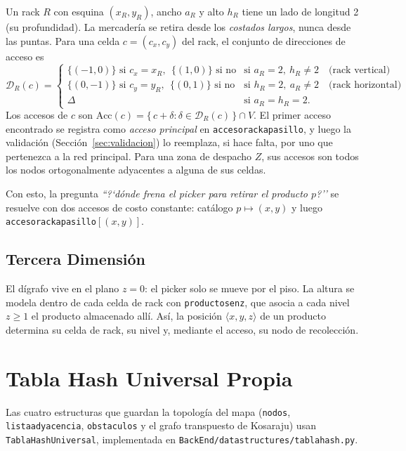 \documentclass[11pt,a4paper]{article}
\theoremstyle{definition}
\begin{document}
Un rack $R$ con esquina $(x_R,y_R)$, ancho $a_R$ y alto $h_R$ tiene un lado de longitud 2 (su profundidad). La mercadería se retira desde los \emph{costados largos}, nunca desde las puntas. Para una celda $c=(c_x,c_y)$ del rack, el conjunto de direcciones de acceso es
\[
\mathcal{D}_R(c)=
\begin{cases}
\{(-1,0)\} \text{ si } c_x=x_R,\ \ \{(1,0)\} \text{ si no} & \text{si } a_R=2,\ h_R\neq 2 \quad\text{(rack vertical)}\\
\{(0,-1)\} \text{ si } c_y=y_R,\ \ \{(0,1)\} \text{ si no} & \text{si } h_R=2,\ a_R\neq 2 \quad\text{(rack horizontal)}\\
\Delta & \text{si } a_R=h_R=2.
\end{cases}
\]
Los accesos de $c$ son $\mathrm{Acc}(c)=\{\,c+\delta : \delta\in\mathcal{D}_R(c)\,\}\cap V$. El primer acceso encontrado se registra como \emph{acceso principal} en \texttt{acceso{}rack{}a{}pasillo}, y luego la validación (Sección~\ref{sec:validacion}) lo reemplaza, si hace falta, por uno que pertenezca a la red principal. Para una zona de despacho $Z$, sus accesos son todos los nodos ortogonalmente adyacentes a alguna de sus celdas.

Con esto, la pregunta \emph{``?`dónde frena el picker para retirar el producto $p$?''} se resuelve con dos accesos de costo constante: catálogo $p\mapsto(x,y)$ y luego \texttt{acceso{}rack{}a{}pasillo}$[(x,y)]$.

\subsection{Tercera Dimensión}

El dígrafo vive en el plano $z=0$: el picker solo se mueve por el piso. La altura se modela dentro de cada celda de rack con \texttt{productos{}en{}z}, que asocia a cada nivel $z\ge 1$ el producto almacenado allí. Así, la posición $\langle x,y,z\rangle$ de un producto determina su celda de rack, su nivel y, mediante el acceso, su nodo de recolección.

\section{Tabla Hash Universal Propia}\label{sec:hash}

Las cuatro estructuras que guardan la topología del mapa (\texttt{nodos}, \texttt{lista{}adyacencia}, \texttt{obstaculos} y el grafo transpuesto de Kosaraju) usan \texttt{TablaHashUniversal}, implementada en \texttt{BackEnd/\allowbreak data{}structures/\allowbreak tabla{}hash.py}.
\end{document}
